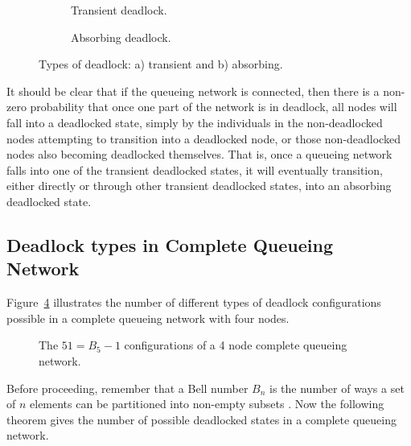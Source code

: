 \documentclass{article}
\begin{document}
\begin{figure}[!htbp]
\begin{center}
\begin{subfigure}[b]{0.45\textwidth}
  
  \caption{Transient deadlock.}
  \label{fig:trans}
\end{subfigure}
\begin{subfigure}[b]{0.45\textwidth}
  
  \caption{Absorbing deadlock.}
  \label{fig:absorb}
\end{subfigure}
\caption{Types of deadlock: a) transient and b) absorbing.}
\label{fig:transabsorb}
\end{center}
\end{figure}

It should be clear that if the queueing network is connected, then there is a non-zero probability that once one part of the network is in deadlock, all nodes will fall into a deadlocked state, simply by the individuals in the non-deadlocked nodes attempting to transition into a deadlocked node, or those non-deadlocked nodes also becoming deadlocked themselves.
That is, once a queueing network falls into one of the transient deadlocked states, it will eventually transition, either directly or through other transient deadlocked states, into an absorbing deadlocked state.

\subsection{Deadlock types in Complete Queueing Network}

Figure~\ref{fig:4nodecombinations} illustrates the number of different types of deadlock configurations possible in a complete queueing network with four nodes.

\begin{figure}[!htbp]
  \begin{center}
    
  \end{center}
  \caption{The $51 = B_5-1$ configurations of a 4 node complete queueing network.}
  \label{fig:4nodecombinations}
\end{figure}

Before proceeding, remember that a Bell number $B_n$ is the number of ways a set of $n$ elements can be partitioned into non-empty subsets \cite{cameron94}.
Now the following theorem gives the number of possible deadlocked states in a complete queueing network.\\
\end{document}
